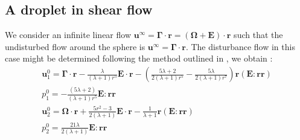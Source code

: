 \subsection{A droplet in shear flow}

We consider an infinite linear flow $\textbf{u}^\infty = \bm\Gamma\cdot \textbf{r} =(\bm\Omega + \textbf{E})\cdot \textbf{r} $ such that the undisturbed flow around the sphere is $\textbf{u}^\infty = \bm\Gamma\cdot\textbf{r}$.
The disturbance flow in this case might be determined following the method outlined in \citep{leal2007advanced}, we obtain  :
\begin{align*}
    \textbf{u}^0_1
    = \bm\Gamma\cdot\textbf{r}
    -\frac{\lambda}{(\lambda + 1)r^5} \textbf{E}\cdot\textbf{r}
    - \left(\frac{5\lambda +2}{2(\lambda +1 )r^5} - \frac{5\lambda}{2(\lambda+1)r^7}\right) \textbf{r}(\textbf{E}:\textbf{rr})\\
    p_1^0 
    = -\frac{(5\lambda+2)}{(\lambda+1)r^5}\textbf{E}:\textbf{rr}\\
    \textbf{u}^0_2
    = \bm\Omega\cdot\textbf{r}
    + \frac{5r^2- 3}{2(\lambda + 1)} 
    \textbf{E}\cdot\textbf{r}
    -\frac{1}{\lambda+1} \textbf{r}(\textbf{E}:\textbf{rr})\\
    p_2^0 
    = \frac{21\lambda}{2(\lambda+1)}
    \textbf{E}:\textbf{rr}
\end{align*}


